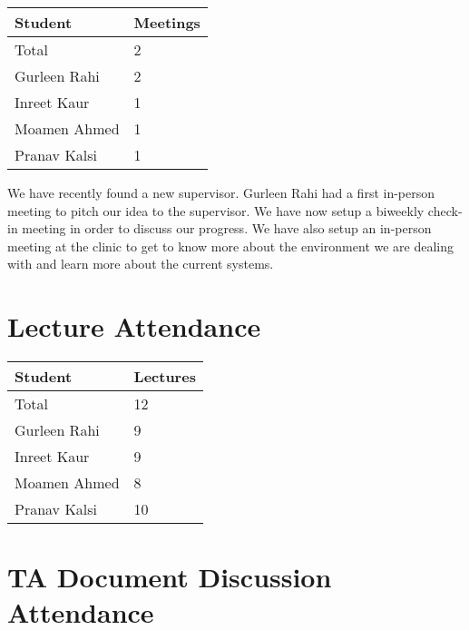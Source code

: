\documentclass{article}
\begin{document}
\begin{table}[H]
\centering
\begin{tabular}{ll}
\toprule
\textbf{Student} & \textbf{Meetings}\\
\midrule
Total & 2 \\
Gurleen Rahi & 2\\
Inreet Kaur & 1\\
Moamen Ahmed & 1\\
Pranav Kalsi & 1\\
\bottomrule
\end{tabular}
\end{table}

We have recently found a new supervisor. Gurleen Rahi had a first in-person meeting to pitch our idea to the supervisor. We have now setup a biweekly check-in meeting in order to discuss our progress. We have also setup an in-person meeting at the clinic to get to know more about the environment we are dealing with and learn more about the current systems. 

\section{Lecture Attendance}


\begin{table}[H]
\centering
\begin{tabular}{ll}
\toprule
\textbf{Student} & \textbf{Lectures}\\
\midrule
Total & 12\\
Gurleen Rahi & 9\\ 
Inreet Kaur & 9\\
Moamen Ahmed & 8\\
Pranav Kalsi & 10\\
\bottomrule
\end{tabular}
\end{table}


\section{TA Document Discussion Attendance}
\end{document}
